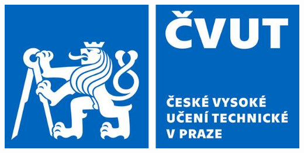 \documentclass[25pt]{tikzposter}
\begin{document}
\begin{columns}
{\begin{minipage}{.04\textwidth}
  \end{minipage}
  \hspace{.04\textwidth}
  \begin{minipage}{.05\textwidth}
    \includegraphics[height=\textwidth]{cvut-logo.jpeg}
  \end{minipage}
  \hspace{.04\textwidth}
}


\end{columns}
\end{document}
